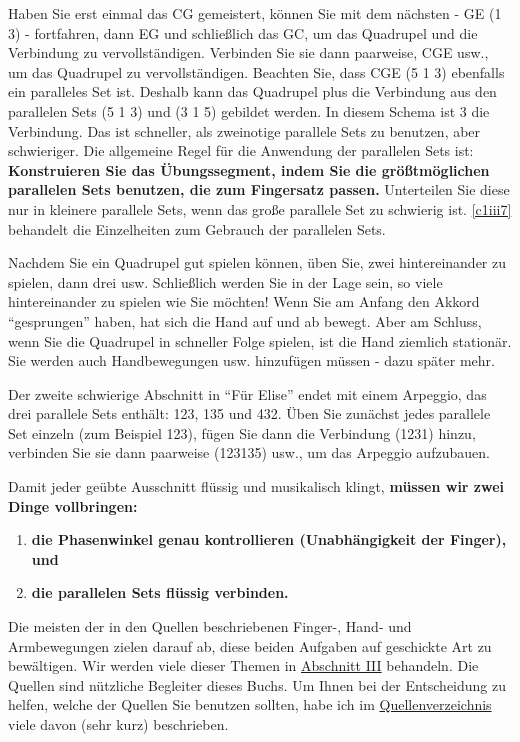 Haben Sie erst einmal das CG gemeistert, können Sie mit dem nächsten - GE (1 3) - fortfahren, dann EG und schließlich das GC, um das Quadrupel und die Verbindung zu vervollständigen.
Verbinden Sie sie dann paarweise, CGE usw., um das Quadrupel zu vervollständigen.
Beachten Sie, dass CGE (5 1 3) ebenfalls ein paralleles Set ist.
Deshalb kann das Quadrupel plus die Verbindung aus den parallelen Sets (5 1 3) und (3 1 5) gebildet werden.
In diesem Schema ist 3 die Verbindung.
Das ist schneller, als zweinotige parallele Sets zu benutzen, aber schwieriger.
Die allgemeine Regel für die Anwendung der parallelen Sets ist: \textbf{Konstruieren Sie das Übungssegment, indem Sie die größtmöglichen parallelen Sets benutzen, die zum Fingersatz passen.}
Unterteilen Sie diese nur in kleinere parallele Sets, wenn das große parallele Set zu schwierig ist.
\hyperref[c1iii7]{\ref*{c1iii7}} behandelt die Einzelheiten zum Gebrauch der parallelen Sets.

Nachdem Sie ein Quadrupel gut spielen können, üben Sie, zwei hintereinander zu spielen, dann drei usw.
Schließlich werden Sie in der Lage sein, so viele hintereinander zu spielen wie Sie möchten!
Wenn Sie am Anfang den Akkord \enquote{gesprungen} haben, hat sich die Hand auf und ab bewegt.
Aber am Schluss, wenn Sie die Quadrupel in schneller Folge spielen, ist die Hand ziemlich stationär.
Sie werden auch Handbewegungen usw. hinzufügen müssen - dazu später mehr.

Der zweite schwierige Abschnitt in \enquote{Für Elise} endet mit einem Arpeggio, das drei parallele Sets enthält: 123, 135 und 432.
Üben Sie zunächst jedes parallele Set einzeln (zum Beispiel 123), fügen Sie dann die Verbindung (1231) hinzu, verbinden Sie sie dann paarweise (123135) usw., um das Arpeggio aufzubauen.

Damit jeder geübte Ausschnitt flüssig und musikalisch klingt, \textbf{müssen wir zwei Dinge vollbringen:}

\begin{enumerate}[label={\arabic*.}] 
 \item \textbf{die Phasenwinkel genau kontrollieren (Unabhängigkeit der Finger), und}
 \item \textbf{die parallelen Sets flüssig verbinden.}
\end{enumerate}

Die meisten der in den Quellen beschriebenen Finger-, Hand- und Armbewegungen zielen darauf ab, diese beiden Aufgaben auf geschickte Art zu bewältigen.
Wir werden viele dieser Themen in \hyperref[c1iii1]{Abschnitt III} behandeln.
Die Quellen sind nützliche Begleiter dieses Buchs.
Um Ihnen bei der Entscheidung zu helfen, welche der Quellen Sie benutzen sollten, habe ich im \hyperref[reference]{Quellenverzeichnis} viele davon (sehr kurz) beschrieben.

